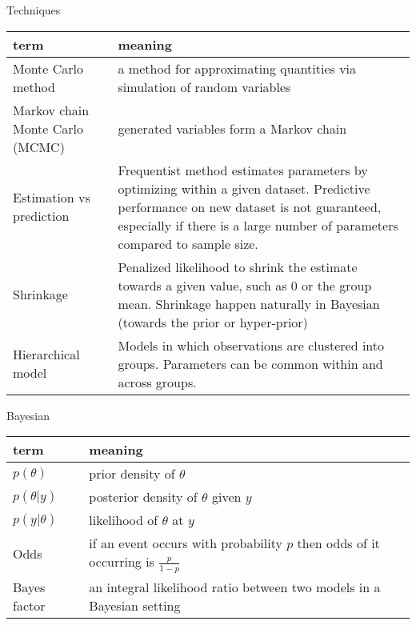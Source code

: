     Techniques\\
    \begin{tabulary}{\linewidth}{L L}
        \hline
        term & meaning\\
        \hline
        \hline
        Monte Carlo method & a method for approximating
        quantities via simulation of random variables\\
        Markov chain Monte Carlo (MCMC) & generated
        variables form a Markov chain\\
        Estimation vs prediction &
        Frequentist method estimates parameters by
        optimizing within a given dataset. Predictive
        performance on new dataset is not guaranteed,
        especially if there is a large number of parameters
        compared to sample size.\\
        Shrinkage & Penalized likelihood to shrink the
        estimate towards a given value, such as 0 or the
        group mean. Shrinkage happen naturally in Bayesian
        (towards the prior or hyper-prior)\\
        Hierarchical model & Models in which observations
        are clustered into groups. Parameters can be common
        within and across groups.
    \end{tabulary}

    Bayesian\\
    \begin{tabulary}{\linewidth}{l L}
        \hline
        term & meaning\\
        \hline
        \hline
        $p(\theta)$ & prior density of $\theta$\\
        $p(\theta|y)$ & posterior density of $\theta$ given $y$\\
        $p(y|\theta)$ & likelihood of $\theta$ at $y$\\
        Odds & if an event occurs with probability $p$ then
        odds of it occurring is $\frac{p}{1-p}$\\
        Bayes factor & an integral likelihood ratio between
        two models in a Bayesian setting\\
    \end{tabulary}

